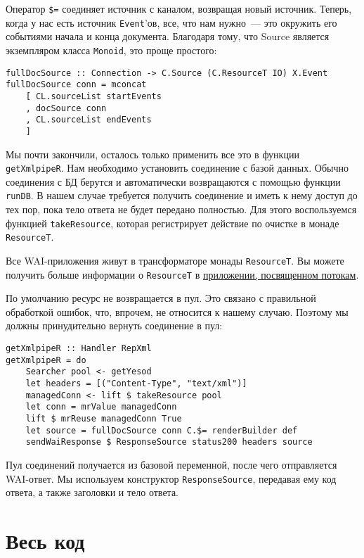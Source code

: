Оператор \lstinline'$=' соединяет источник с каналом, возвращая новый источник. Теперь, когда у нас есть источник \lstinline!Event!'ов, все, что нам нужно~--- это окружить его событиями начала и конца документа. Благодаря тому, что Source является экземпляром класса \lstinline!Monoid!, это проще простого:

\begin{lstlisting}
fullDocSource :: Connection -> C.Source (C.ResourceT IO) X.Event
fullDocSource conn = mconcat
    [ CL.sourceList startEvents
    , docSource conn
    , CL.sourceList endEvents
    ]
\end{lstlisting}

Мы почти закончили, осталось только применить все это в функции \lstinline!getXmlpipeR!. Нам необходимо установить соединение с базой данных. Обычно соединения с БД берутся и автоматически возвращаются с помощью функции \lstinline!runDB!. В нашем случае требуется получить соединение и иметь к нему доступ до тех пор, пока тело ответа не будет передано полностью. Для этого воспользуемся функцией \lstinline!takeResource!, которая регистрирует действие по очистке в монаде \lstinline!ResourceT!.

\begin{remark}
Все WAI-приложения живут в трансформаторе монады \lstinline!ResourceT!. Вы можете получить больше информации о \lstinline!ResourceT! в \hyperref[chap:conduit]{приложении, посвященном потокам}.%
\end{remark}

По умолчанию ресурс не возвращается в пул. Это связано с правильной обработкой ошибок, что, впрочем, не относится к нашему случаю. Поэтому мы должны принудительно вернуть соединение в пул:

\begin{lstlisting}
getXmlpipeR :: Handler RepXml
getXmlpipeR = do
    Searcher pool <- getYesod
    let headers = [("Content-Type", "text/xml")]
    managedConn <- lift $ takeResource pool
    let conn = mrValue managedConn
    lift $ mrReuse managedConn True
    let source = fullDocSource conn C.$= renderBuilder def
    sendWaiResponse $ ResponseSource status200 headers source
\end{lstlisting}

Пул соединений получается из базовой переменной, после чего отправляется WAI-ответ. Мы используем конструктор \lstinline!ResponseSource!, передавая ему код ответа, а также заголовки и тело ответа.

\section{Весь код} %


